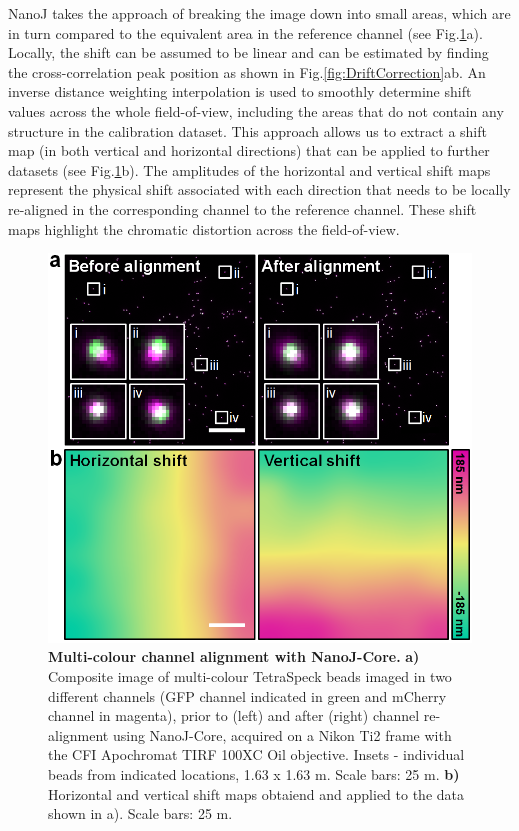  NanoJ takes the approach of breaking the image down into small areas, which are in turn compared to the equivalent area in the reference channel (see Fig.\ref{fig:ChannelAlignment}a). Locally, the shift can be assumed to be linear and can be estimated by finding the cross-correlation peak position as shown in Fig.\ref{fig:DriftCorrection}ab. An inverse distance weighting interpolation \cite{shepard1968two} is used to smoothly determine shift values across the whole field-of-view, including the areas that do not contain any structure in the calibration dataset. This approach allows us to extract a shift map (in both vertical and horizontal directions) that can be applied to further datasets (see Fig.\ref{fig:ChannelAlignment}b). The amplitudes of the horizontal and vertical shift maps represent the physical shift associated with each direction that needs to be locally re-aligned in the corresponding channel to the reference channel. These shift maps highlight the chromatic distortion across the field-of-view. 
 
 \begin{figure}[!t]
    \centering
    \includegraphics[width=\linewidth]{Figures/FigureChannelAlignment_v3.png}
    \caption{\textbf{Multi-colour channel alignment with NanoJ-Core.} \textbf{a)} Composite image of multi-colour TetraSpeck beads imaged in two different channels (GFP channel indicated in green and mCherry channel in magenta), prior to (left) and after (right) channel re-alignment using NanoJ-Core, acquired on a Nikon Ti2 frame with the CFI Apochromat TIRF 100XC Oil objective. Insets - individual beads from indicated locations, 1.63 x 1.63 \micro m. Scale bars: 25 \micro m. \textbf{b)} Horizontal and vertical shift maps obtaiend and applied to the data shown in a). Scale bars: 25 \micro m.}
    \label{fig:ChannelAlignment}
\end{figure}
 
